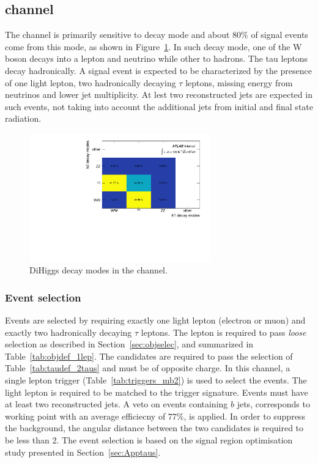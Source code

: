 \subsection{\ltwotau channel}{\Large\bfseries}
\label{sec:1l2taus}

The \ltwotau channel is primarily sensitive to \hhtowwtt decay mode and about $80\%$ of signal events come from this mode, as shown in Figure~\ref{fig:HHdmode}. In such decay mode, one of the W boson decays into a lepton and neutrino while other to hadrons. The tau leptons decay hadronically. A signal event is expected to be characterized by the presence of one light lepton, two hadronically decaying $\tau$ leptons, missing energy from neutrinos and lower jet multiplicity. At lest two reconstructed jets are expected in such events, not taking into account the additional jets from initial and final state radiation.

\begin{figure}[hbtp]
  \begin{center}
    \includegraphics[width=0.7\textwidth]{figures/TauChannels/1l2tau/HHDecayModes}
    \caption{\label{fig:HHdmode} DiHiggs decay modes in the \ltwotau channel.}
  \end{center}
\end{figure}


\subsubsection{Event selection}
Events are selected by requiring exactly one light lepton (electron or muon) and exactly two hadronically decaying $\tau$ leptons. The lepton is required to pass \textit{loose} selection as described in Section~\ref{sec:objselec}, and summarized in Table~\ref{tab:objdef_1lep}. The \tauh candidates are required to pass the selection of Table~\ref{tab:taudef_2taus} and must be of opposite charge. In this channel, a single lepton trigger (Table~\ref{tab:triggers_mb2}) is used to select the events. The light lepton is required to be matched to the trigger signature. Events must have at least two reconstructed jets. A veto on events containing $b$ jets, corresponds to working point with an average efficiecny of $77\%$, is applied. In order to suppress the \vjet background, the angular distance between the two \tauh candidates is required to be less than 2. The event selection is based on the signal region optimisation study presented in Section~\ref{sec:Apptaus}.

